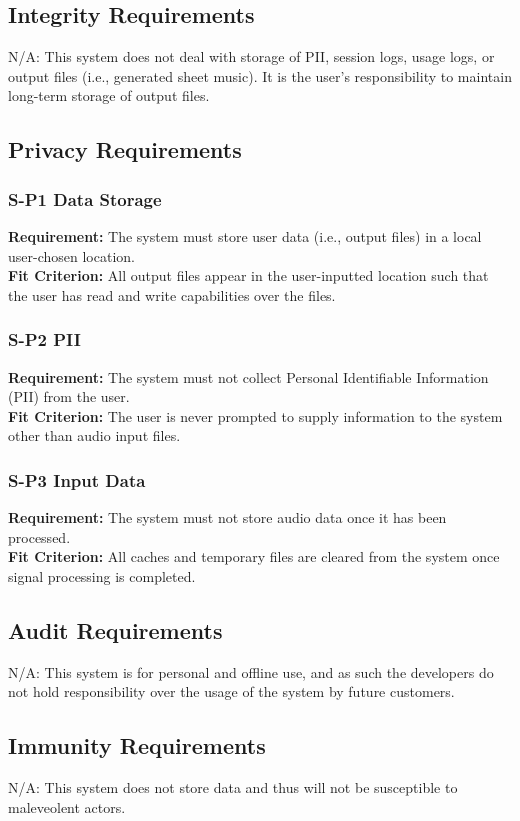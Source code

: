 \documentclass[12pt]{article}
\begin{document}
\subsection{Integrity Requirements}
N/A: This system does not deal with storage of PII, session logs, usage logs, or output files (i.e., generated sheet music). It is the user's responsibility to maintain long-term storage of output files.

\subsection{Privacy Requirements}
\subsubsection*{S-P1 Data Storage} \label{S-P1}
\textbf{Requirement:} The system must store user data (i.e., output files) in a local user-chosen location. \\ 
\textbf{Fit Criterion:} All output files appear in the user-inputted location such that the user has read and write capabilities over the files. 
\subsubsection*{S-P2 PII} \label{S-P2}
\textbf{Requirement:} The system must not collect Personal Identifiable Information (PII) from the user. \\ 
\textbf{Fit Criterion:} The user is never prompted to supply information to the system other than audio input files. 
\subsubsection*{S-P3 Input Data} \label{S-P3}
\textbf{Requirement:} The system must not store audio data once it has been processed. \\ 
\textbf{Fit Criterion:} All caches and temporary files are cleared from the system once signal processing is completed.

\subsection{Audit Requirements}
N/A: This system is for personal and offline use, and as such the developers do not hold responsibility over the usage of the system by future customers.
\subsection{Immunity Requirements}
N/A: This system does not store data and thus will not be susceptible to maleveolent actors.
\end{document}
